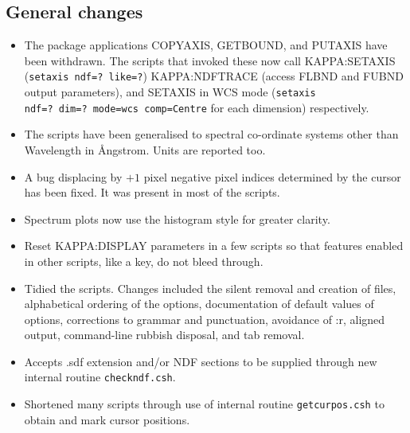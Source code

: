\documentclass[twoside,11pt]{article}
\newcommand{\xref}[3]{#1}
\begin{document}
\subsection{General changes}

\begin{itemize}

\item The package applications COPYAXIS, GETBOUND, and PUTAXIS have
been withdrawn.  The scripts that invoked these now call 
\xref{KAPPA:SETAXIS}{sun95}{SETAXIS} ({\tt setaxis ndf=?~like=?})
\xref{KAPPA:NDFTRACE}{sun95}{NDFTRACE} (access FLBND and FUBND output
parameters), and \xref{SETAXIS in WCS mode}{sun95}{SETAXIS}
({\tt setaxis ndf=?~dim=?~mode=wcs comp=Centre} for each dimension)
respectively.

\item The scripts have been generalised to spectral co-ordinate
systems other than Wavelength in {\AA}ngstrom.  Units are reported too.

\item A bug displacing by $+1$ pixel negative pixel indices determined
by the cursor has been fixed.  It was present in most of the scripts.

\item Spectrum plots now use the histogram style for greater clarity.

\item  Reset \xref{KAPPA:DISPLAY}{sun95}{DISPLAY} parameters in a 
few scripts so that features enabled in other scripts, like a key, 
do not bleed through.

\item Tidied the scripts.  Changes included the silent removal and
creation of files, alphabetical ordering of the options, documentation
of default values of options, corrections to grammar and punctuation,
avoidance of :r, aligned output, command-line rubbish disposal,
and tab removal.

\item Accepts .sdf extension and/or NDF sections to be supplied
through new internal routine {\tt checkndf.csh}.

\item Shortened many scripts through use of internal routine
{\tt getcurpos.csh} to obtain and mark cursor positions.

\end{itemize}
\end{document}
